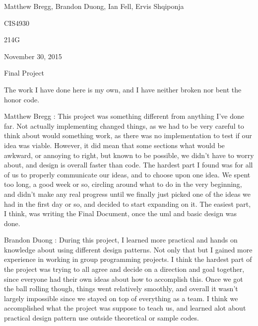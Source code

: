 \documentclass{article}
\begin{document}
\begin{flushright}
Matthew Bregg, Brandon Duong, Ian Fell, Ervis Shqiponja
\end{flushright}
\begin{flushright}
CIS4930
\end{flushright}
\begin{flushright}
214G
\end{flushright}
\begin{flushright}
November 30, 2015
\end{flushright}
\begin{flushright}
Final Project 
\end{flushright}
The work I have done here is my own, and I have neither broken nor bent the honor code.
\newline
\begin{list}{Learning Experiance, }{}
\item Matthew Bregg : This project was something different from anything I've done far. Not actually implementing changed things, as we had to be very careful to think about would something work, as there was no implementation to test if our idea was viable. However, it did mean that some sections what would be awkward, or annoying to right, but known to be possible, we didn't have to worry about, and design is overall faster than code. The hardest part I found was for all of us to properly communicate our ideas, and to choose upon one idea. We spent too long, a good week or so, circling around what to do in the very beginning, and didn't make any real progress until we finally just picked one of the ideas we had in the first day or so, and decided to start expanding on it. The easiest part, I think, was writing the Final Document, once the uml and basic design was done. 
\item Brandon Duong : During this project, I learned more practical and hands on knowledge about using different design patterns. Not only that but I gained more experience in working in group programming projects. I think the hardest part of the project was trying to all agree and decide on a direction and goal together, since everyone had their own ideas about how to accomplish this. Once we got the ball rolling though, things went relatively smoothly, and overall it wasn't largely impossible since we stayed on top of everything as a team. I think we accomplished what the project was suppose to teach us, and learned alot about practical design pattern use outside  theoretical or sample codes.

\end{list}
\end{document}
